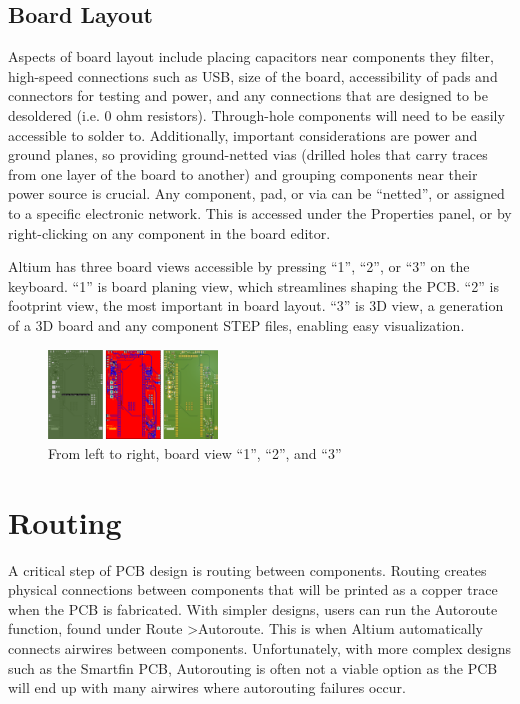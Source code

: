 \documentclass[twocolumn]{article}
\begin{document}
\subsection{Board Layout}
Aspects of board layout include placing capacitors near components they filter, high-speed connections such as USB, size of the board, accessibility of pads and connectors for testing and power, and any connections that are designed to be desoldered (i.e. 0 ohm resistors). Through-hole components will need to be easily accessible to solder to. Additionally, important considerations are power and ground planes, so providing ground-netted vias (drilled holes that carry traces from one layer of the board to another) and grouping components near their power source is crucial. Any component, pad, or via can be ``netted'', or assigned to a specific electronic network. This is accessed under the Properties panel, or by right-clicking on any component in the board editor.

Altium has three board views accessible by pressing ``1'', ``2'', or ``3'' on the keyboard. ``1'' is board planing view, which streamlines shaping the PCB. ``2'' is footprint view, the most important in board layout. ``3'' is 3D view, a generation of a 3D board and any component STEP files, enabling easy visualization.

\begin{figure}[ht]
    \centering
    \includegraphics[width=0.4\textwidth]{board view.png}
    \caption{From left to right, board view ``1'', ``2'', and ``3''}
    \label{fig:board-view}
\end{figure}

\section{Routing}

A critical step of PCB design is routing between components. Routing creates physical connections between components that will be printed as a copper trace when the PCB is fabricated. With simpler designs, users can run the Autoroute function, found under Route \textgreater Autoroute. This is when Altium automatically connects airwires between components. Unfortunately, with more complex designs such as the Smartfin PCB, Autorouting is often not a viable option as the PCB will end up with many airwires where autorouting failures occur.
\end{document}
